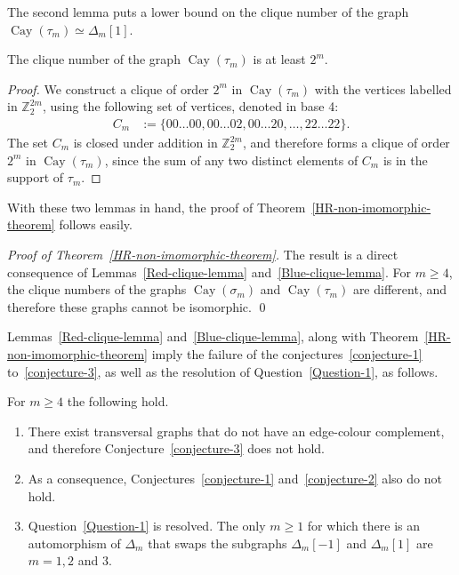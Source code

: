 \documentclass[11pt,a4paper]{jacodesmath}
\newcommand{\mb}[1]{\mathbb{#1}}
\newcommand{\Cay}{\operatorname{Cay}}
\newcommand{\Z}{\mb{Z}}
\newcommand{\isomorphic}{\simeq}
\newenvironment{proofof}[1]{\noindent\emph{Proof of #1.}}{\qed}
\begin{document}
The second lemma puts a lower bound on the clique number of the graph $\Cay(\tau_m) \isomorphic
\varDelta_m[1]$.
\begin{lemma}
\label{Blue-clique-lemma}
The clique number of the graph $\Cay(\tau_m)$ is at least $2^m$.
\end{lemma}
\begin{proof}
We construct a clique of order $2^m$ in $\Cay(\tau_m)$ with the vertices labelled in $\Z_2^{2m}$,
using the following set of vertices, denoted in base 4:
\begin{align*}
C_m &:= \{ 00 \ldots 00, 00 \ldots 02, 00 \ldots 20, \ldots, 22 \ldots 22 \}.
\end{align*}
The set $C_m$ is closed under addition in $\Z_2^{2 m}$,
and therefore forms a clique of order $2^m$ in $\Cay(\tau_m)$,
since the sum of any two distinct elements of $C_m$ is in the support of $\tau_m$.
\end{proof}

With these two lemmas in hand, the proof of Theorem~\ref{HR-non-imomorphic-theorem} follows easily.

\begin{proofof}{Theorem~\ref{HR-non-imomorphic-theorem}}
The result is a direct consequence of Lemmas~\ref{Red-clique-lemma} and~\ref{Blue-clique-lemma}.
For $m \geqslant 4$, the clique numbers of the graphs $\Cay(\sigma_m)$ and $\Cay(\tau_m)$ are
different,
and therefore these graphs cannot be isomorphic.
\end{proofof}

Lemmas~\ref{Red-clique-lemma} and~\ref{Blue-clique-lemma}, along with
Theorem~\ref{HR-non-imomorphic-theorem}
imply the failure of the conjectures~\ref{conjecture-1} to~\ref{conjecture-3}, as well as the
resolution of Question~\ref{Question-1}, as follows.
\begin{theorem}
\label{Conjectures-are-false-theorem}
For $m \geqslant 4$ the following hold.
\begin{enumerate}
 \item
There exist transversal graphs that do not have an edge-colour complement, and
therefore Conjecture~\ref{conjecture-3} does not hold.
\item
As a consequence, Conjectures~\ref{conjecture-1} and~\ref{conjecture-2} also do not hold.
\item
Question~\ref{Question-1} is resolved.
The only $m \geqslant 1$ for which there is an automorphism of $\varDelta_m$
that swaps the subgraphs $\varDelta_m[-1]$ and $\varDelta_m[1]$
are $m=1,2$ and $3$.
\end{enumerate}

\end{theorem}
\end{document}
